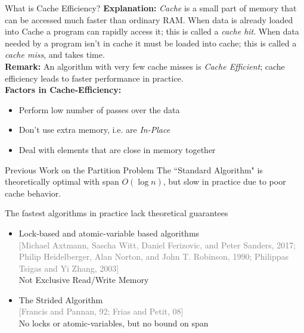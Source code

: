\documentclass[table,serif,mathserif,final]{beamer}
\newcommand{\citefont}[1]{{\huge \textcolor{gray}{#1}}}
\theoremstyle{remark}
\begin{document}
\begin{frame}{}
\begin{columns}[t]
\begin{column}{0.21\linewidth}
\begin{block}{\Huge What is Cache Efficiency?}
  \justifying
  \Huge
  \textbf{Explanation:} \emph{Cache} is a small part of memory that can be accessed much faster than ordinary RAM. When data is already loaded into Cache a program can rapidly access it; this is called a \emph{cache hit}. When data needed by a program isn't in cache it must be loaded into cache; this is called a \emph{cache miss}, and takes time. \\
  \textbf{Remark:} An algorithm with very few cache misses is \emph{Cache Efficient}; cache efficiency leads to faster performance in practice.\\
  \textbf{Factors in Cache-Efficiency:}
  \begin{itemize}
    \item Perform low number of passes over the data
    \item Don't use extra memory, i.e. are \emph{In-Place}
    \item Deal with elements that are close in memory together
  \end{itemize}
\end{block}
\vspace{0.5cm}

\begin{block}{\Huge Previous Work on the Partition Problem}
  \justifying
  \Huge
  The ``Standard Algorithm" is {\color{darkgreen} theoretically optimal with span $O(\log n)$,} {\color{red} but slow in practice due to poor cache behavior.}

  The {\color{darkgreen}fastest algorithms in practice} {\color{red}lack theoretical guarantees}
  \begin{itemize}
    \item Lock-based and atomic-variable based algorithms\\ \citefont{[Michael Axtmann, Sascha Witt, Daniel Ferizovic, and Peter Sanders, 2017; Philip Heidelberger, Alan Norton, and John T. Robinson, 1990; Philippas Tsigas and Yi Zhang, 2003]}\\
      {\color{red} Not Exclusive Read/Write Memory}
    \item The Strided Algorithm\\ \citefont{[Francis and Pannan, 92; Frias and Petit, 08]}\\ 
      {\color{darkgreen}No locks or atomic-variables,} {\color{red}but no bound on span}
  \end{itemize}
\end{block}
\end{column}


\end{columns}
\end{frame}
\end{document}
